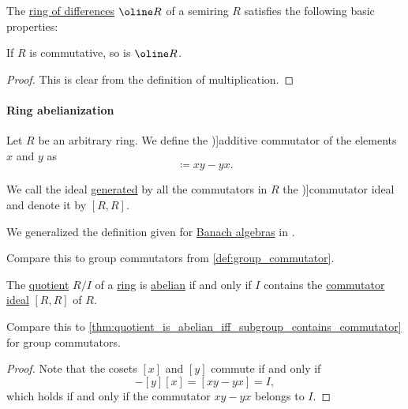 \begin{proposition}\label{thm:def:ring_of_differences}
  The \hyperref[def:ring_of_differences]{ring of differences} \( \oline R \) of a semiring \( R \) satisfies the following basic properties:
  \begin{thmenum}
     If \( R \) is commutative, so is \( \oline R \).
  \end{thmenum}
\end{proposition}
\begin{proof}
   This is clear from the definition of multiplication.
\end{proof}

\paragraph{Ring abelianization}

\begin{definition}\label{def:ring_commutator}\mimprovised
  Let \( R \) be an arbitrary ring. We define the \term[en=additive commutator (\cite[145]{Kaplansky1974CommutativeRings})]{additive commutator} of the elements \( x \) and \( y \) as
  \begin{equation*}
    [x, y] \coloneqq xy - yx.
  \end{equation*}

  We call the ideal \hyperref[def:semiring_ideal/generated]{generated} by all the commutators in \( R \) the \term[en=commutator ideal (in Banach algebra) (\cite[222]{Conway1997FunctionalAnalysis})]{commutator ideal} and denote it by \( [R, R] \).
\end{definition}
\begin{comments}
  \item We generalized the definition given for \hyperref[def:banach_algebra]{Banach algebras} in \cite[222]{Conway1997FunctionalAnalysis}.

  \item Compare this to group commutators from \cref{def:group_commutator}.
\end{comments}

\begin{proposition}\label{thm:quotient_is_abelian_iff_ideal_contains_commutator}
  The \hyperref[def:ring/quotient]{quotient} \( R / I \) of a \hyperref[def:ring]{ring} is \hyperref[def:abelian_group]{abelian} if and only if \( I \) contains the \hyperref[def:ring_commutator]{commutator ideal} \( [R, R] \) of \( R \).
\end{proposition}
\begin{comments}
  \item Compare this to \cref{thm:quotient_is_abelian_iff_subgroup_contains_commutator} for group commutators.
\end{comments}
\begin{proof}
  Note that the cosets \( [x] \) and \( [y] \) commute if and only if
  \begin{equation*}
    [x] [y] - [y] [x] = [xy - yx] = I,
  \end{equation*}
  which holds if and only if the commutator \( xy - yx \) belongs to \( I \).
\end{proof}

